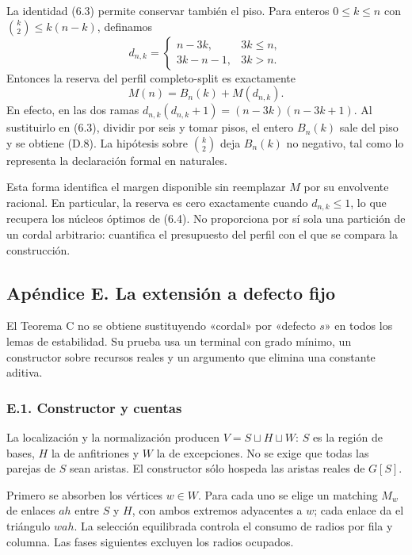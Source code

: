 \documentclass[spanish,11pt,a4paper]{article}
\begin{document}
La identidad (6.3) permite conservar también el piso. Para enteros \(0\le k\le n\) con \(\binom k2\le k(n-k)\), definamos \[
d_{n,k}=\begin{cases}n-3k,&3k\le n,\\3k-n-1,&3k>n.\end{cases}
\] Entonces la reserva del perfil completo-split es exactamente \[
M(n)=B_n(k)+M(d_{n,k}).
\tag{D.8}
\] En efecto, en las dos ramas \(d_{n,k}(d_{n,k}+1)=(n-3k)(n-3k+1)\). Al sustituirlo en (6.3), dividir por seis y tomar pisos, el entero \(B_n(k)\) sale del piso y se obtiene (D.8). La hipótesis sobre \(\binom k2\) deja \(B_n(k)\) no negativo, tal como lo representa la declaración formal en naturales.

Esta forma identifica el margen disponible sin reemplazar \(M\) por su envolvente racional. En particular, la reserva es cero exactamente cuando \(d_{n,k}\le1\), lo que recupera los núcleos óptimos de (6.4). No proporciona por sí sola una partición de un cordal arbitrario: cuantifica el presupuesto del perfil con el que se compara la construcción.

\subsection{Apéndice E. La extensión a defecto fijo}\label{apendice-e.-la-extension-a-defecto-fijo}

El Teorema C no se obtiene sustituyendo «cordal» por «defecto \(s\)» en todos los lemas de estabilidad. Su prueba usa un terminal con grado mínimo, un constructor sobre recursos reales y un argumento que elimina una constante aditiva.

\subsubsection{E.1. Constructor y cuentas}\label{e.1.-constructor-y-cuentas}

La localización y la normalización producen \(V=S\sqcup H\sqcup W\): \(S\) es la región de bases, \(H\) la de anfitriones y \(W\) la de excepciones. No se exige que todas las parejas de \(S\) sean aristas. El constructor sólo hospeda las aristas reales de \(G[S]\).

Primero se absorben los vértices \(w\in W\). Para cada uno se elige un matching \(M_w\) de enlaces \(ah\) entre \(S\) y \(H\), con ambos extremos adyacentes a \(w\); cada enlace da el triángulo \(wah\). La selección equilibrada controla el consumo de radios por fila y columna. Las fases siguientes excluyen los radios ocupados.
\end{document}
